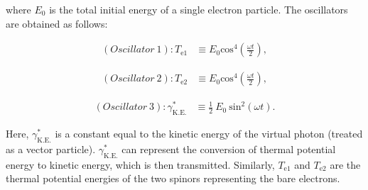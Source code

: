 \documentclass[reprint,amsmath,amssymb,aps,]{revtex4-1}
\numberwithin{equation}{section}%
\begin{document}
    \noindent
    where $E_{0}$ is the total initial energy of a single electron particle. The oscillators are obtained as follows:

        \begin{equation}
            \begin{split}
                (Oscillator \ 1):
                T_{\mathrm{e1}} 
                    & \equiv E_{0} \mathrm{cos}^{4} \left( \frac{\omega t}{2} \right)
                    ,
                \label{ez_Osc_2_PE}
            \end{split}
        \end{equation}

        \begin{equation}
            \begin{split}
                (Oscillator \ 2): T_{\mathrm{e2}} 
                    & \equiv E_{0} \mathrm{cos}^{4} \left( \frac{\omega t}{2} \right)
                    ,
                \label{ez_Osc_3_PE}
            \end{split}
        \end{equation}


        \begin{equation}
            \begin{split}
                (Oscillator \ 3): \gamma^{*}_\mathrm{K.E.}
                    & \equiv \frac{1}{2} \ E_{0} \ \mathrm{sin}^{2} (\omega t)
                    .
                \label{ez_Osc_1_KE}  
            \end{split}
        \end{equation}

    Here, $\gamma^{*}_\mathrm{K.E.}$ is a constant equal to the kinetic energy of the virtual photon (treated as a vector particle). $\gamma^{*}_\mathrm{K.E.}$ can represent the conversion of thermal potential energy to kinetic energy, which is then transmitted. Similarly, $T_{\mathrm{e1}}$ and $T_{\mathrm{e2}}$ are the thermal potential energies of the two spinors representing the bare electrons.


\end{document}
